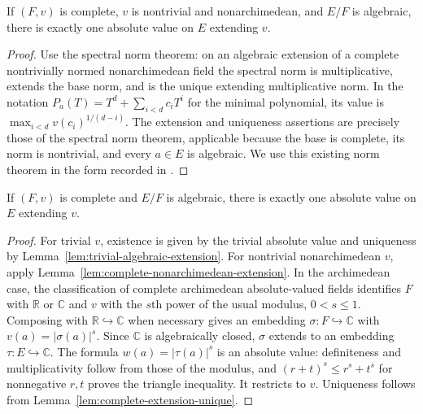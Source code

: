 \begin{lemma}
\label{lem:complete-nonarchimedean-extension}
\leanok
{}
If $(F,v)$ is complete, $v$ is nontrivial and nonarchimedean, and $E/F$
is algebraic, there is exactly one absolute value on $E$ extending $v$.
\end{lemma}
\begin{proof}
Use the spectral norm theorem: on an algebraic extension
of a complete nontrivially normed nonarchimedean field the spectral norm is
multiplicative, extends the base norm, and is the unique extending
multiplicative norm. In the notation $P_a(T)=T^d+\sum_{i<d}c_iT^i$ for
the minimal polynomial, its value is
$\max_{i<d}v(c_i)^{1/(d-i)}$. The extension and uniqueness assertions are
precisely those of the spectral norm theorem, applicable because the base is
complete, its norm is nontrivial, and every $a\in E$ is algebraic. We use
this existing norm theorem in the form recorded in
\cite{mathlib-spectral-norm}.
\end{proof}

\begin{lemma}\label{lem:complete-extension}
\leanok
{}
If $(F,v)$ is complete and $E/F$ is algebraic, there is exactly one
absolute value on $E$ extending $v$.
\end{lemma}
\begin{proof}
For trivial $v$, existence is given by the trivial absolute value and
uniqueness by Lemma~\ref{lem:trivial-algebraic-extension}. For nontrivial
nonarchimedean $v$, apply Lemma~\ref{lem:complete-nonarchimedean-extension}.
In the archimedean case, the classification of complete archimedean
absolute-valued fields identifies $F$ with $\mathbb R$ or $\mathbb C$ and
$v$ with the $s$th power of the usual modulus, $0<s\leq1$.
Composing with $\mathbb R\hookrightarrow\mathbb C$ when necessary
gives an embedding $\sigma:F\hookrightarrow\mathbb C$ with
$v(a)=|\sigma(a)|^s$. Since $\mathbb C$ is algebraically closed,
$\sigma$ extends to an embedding $\tau:E\hookrightarrow\mathbb C$.
The formula $w(a)=|\tau(a)|^s$ is an absolute value: definiteness
and multiplicativity follow from those of the modulus, and
$(r+t)^s\leq r^s+t^s$ for nonnegative $r,t$ proves the triangle
inequality. It restricts to $v$. Uniqueness follows from
Lemma~\ref{lem:complete-extension-unique}.
\end{proof}


